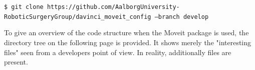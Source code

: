 \hspace{0cm} \texttt{\$ git clone https://github.com/AalborgUniversity-RoboticSurgeryGroup/\newline davinci\_moveit\_config ---branch develop} \ \ \ {}

To give an overview of the code structure when the Moveit package is used, the directory tree on the following page is provided. It shows merely the "interesting files" seen from a developers point of view. In reality, additionally files are present. 
\renewcommand*\DTstylecomment{\rmfamily\color{gray}\textsc}
\renewcommand*\DTstyle{\ttfamily\textcolor{blue}}

